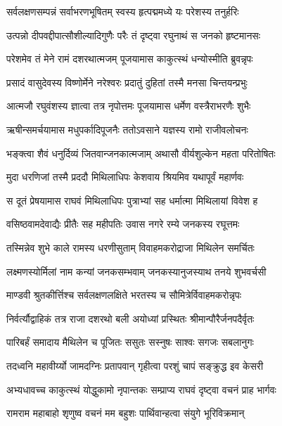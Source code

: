 \twolineshloka
{सर्वलक्षणसम्पन्नं सर्वाभरणभूषितम्}
{स्वस्य हृत्पद्ममध्ये यः परेशस्य तनुर्हरिः}%

\twolineshloka
{उत्पन्नो दीपवद्दीपात्सौशील्यादिगुणैः परैः}
{तं दृष्ट्वा रघुनाथं स जनको हृष्टमानसः}%

\twolineshloka
{परेशमेव तं मेने रामं दशरथात्मजम्}
{पूजयामास काकुत्स्थं धन्योस्मीति ब्रुवन्नृपः}%

\twolineshloka
{प्रसादं वासुदेवस्य विष्णोर्मेने नरेश्वरः}
{प्रदातुं दुहितां तस्मै मनसा चिन्तयन्प्रभुः}%

\twolineshloka
{आत्मजौ रघुवंशस्य ज्ञात्वा तत्र नृपोत्तमः}
{पूजयामास धर्मेण वस्त्रैराभरणैः शुभैः}%

\twolineshloka
{ऋषीन्समर्चयामास मधुपर्कादिपूजनैः}
{ततोऽवसाने यज्ञस्य रामो राजीवलोचनः}%

\twolineshloka
{भङ्क्त्वा शैवं धनुर्दिव्यं जितवान्जनकात्मजाम्}
{अथासौ वीर्यशुल्केन महता परितोषितः}%

\twolineshloka
{मुदा धरणिजां तस्मै प्रददौ मिथिलाधिपः}
{केशवाय श्रियमिव यथापूर्वं महार्णवः}%

\twolineshloka
{स दूतं प्रेषयामास राघवं मिथिलाधिपः}
{पुत्राभ्यां सह धर्मात्मा मिथिलायां विवेश ह}%

\twolineshloka
{वसिष्ठवामदेवाद्यैः प्रीतैः सह महीपतिः}
{उवास नगरे रम्ये जनकस्य रघूत्तमः}%

\twolineshloka
{तस्मिन्नेव शुभे काले रामस्य धरणीसुताम्}
{विवाहमकरोद्राजा मिथिलेन समर्चितः}%

\twolineshloka
{लक्ष्मणस्योर्मिलां नाम कन्यां जनकसम्भवाम्}
{जनकस्यानुजस्याथ तनये शुभवर्चसी}%

\twolineshloka
{माण्डवी श्रुतकीर्त्तिश्च सर्वलक्षणलक्षिते}
{भरतस्य च सौमित्रेर्विवाहमकरोन्नृपः}%

\twolineshloka
{निर्वर्त्यौद्वाहिकं तत्र राजा दशरथो बली}
{अयोध्यां प्रस्थितः श्रीमान्पौरैर्जनपदैर्वृतः}%

\twolineshloka
{पारिबर्हं समादाय मैथिलेन च पूजितः}
{ससुतः सस्नुषः साश्वः सगजः सबलानुगः}%

\twolineshloka
{तदध्वनि महावीर्य्यो जामदग्निः प्रतापवान्}
{गृहीत्वा परशुं चापं सङ्क्रुद्ध इव केसरी}%

\twolineshloka
{अभ्यधावच्च काकुत्स्थं योद्धुकामो नृपान्तकः}
{सम्प्राप्य राघवं दृष्ट्वा वचनं प्राह भार्गवः}%


\twolineshloka
{रामराम महाबाहो शृणुष्व वचनं मम}
{बहुशः पार्थिवान्हत्वा संयुगे भूरिविक्रमान्}%

